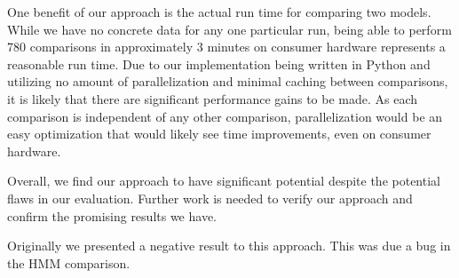 One benefit of our approach is the actual run time for comparing two models.
While we have no concrete data for any one particular run, being able to perform 780 comparisons in approximately 3 minutes on consumer hardware represents a reasonable run time.
Due to our implementation being written in Python and utilizing no amount of parallelization and minimal caching between comparisons, it is likely that there are significant performance gains to be made.
As each comparison is independent of any other comparison, parallelization would be an easy optimization that would likely see time improvements, even on consumer hardware.

Overall, we find our approach to have significant potential despite the potential flaws in our evaluation.
Further work is needed to verify our approach and confirm the promising results we have.

Originally we presented a negative result to this approach. This was due a bug in the HMM comparison.
